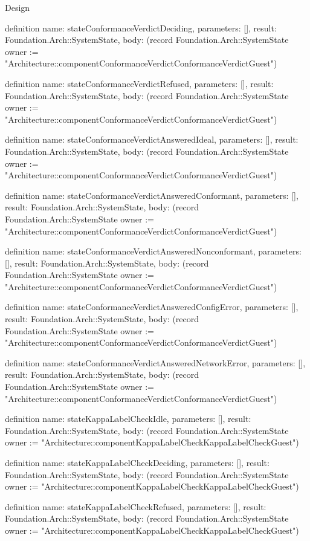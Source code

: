 \begin{lexlean}{Design}
\begin{semanticmodule}
definition{
  name: stateConformanceVerdictDeciding,
  parameters: [],
  result: Foundation.Arch::SystemState,
  body: (record Foundation.Arch::SystemState {owner := "Architecture::componentConformanceVerdictConformanceVerdictGuest"})
}

definition{
  name: stateConformanceVerdictRefused,
  parameters: [],
  result: Foundation.Arch::SystemState,
  body: (record Foundation.Arch::SystemState {owner := "Architecture::componentConformanceVerdictConformanceVerdictGuest"})
}

definition{
  name: stateConformanceVerdictAnsweredIdeal,
  parameters: [],
  result: Foundation.Arch::SystemState,
  body: (record Foundation.Arch::SystemState {owner := "Architecture::componentConformanceVerdictConformanceVerdictGuest"})
}

definition{
  name: stateConformanceVerdictAnsweredConformant,
  parameters: [],
  result: Foundation.Arch::SystemState,
  body: (record Foundation.Arch::SystemState {owner := "Architecture::componentConformanceVerdictConformanceVerdictGuest"})
}

definition{
  name: stateConformanceVerdictAnsweredNonconformant,
  parameters: [],
  result: Foundation.Arch::SystemState,
  body: (record Foundation.Arch::SystemState {owner := "Architecture::componentConformanceVerdictConformanceVerdictGuest"})
}

definition{
  name: stateConformanceVerdictAnsweredConfigError,
  parameters: [],
  result: Foundation.Arch::SystemState,
  body: (record Foundation.Arch::SystemState {owner := "Architecture::componentConformanceVerdictConformanceVerdictGuest"})
}

definition{
  name: stateConformanceVerdictAnsweredNetworkError,
  parameters: [],
  result: Foundation.Arch::SystemState,
  body: (record Foundation.Arch::SystemState {owner := "Architecture::componentConformanceVerdictConformanceVerdictGuest"})
}

definition{
  name: stateKappaLabelCheckIdle,
  parameters: [],
  result: Foundation.Arch::SystemState,
  body: (record Foundation.Arch::SystemState {owner := "Architecture::componentKappaLabelCheckKappaLabelCheckGuest"})
}

definition{
  name: stateKappaLabelCheckDeciding,
  parameters: [],
  result: Foundation.Arch::SystemState,
  body: (record Foundation.Arch::SystemState {owner := "Architecture::componentKappaLabelCheckKappaLabelCheckGuest"})
}

definition{
  name: stateKappaLabelCheckRefused,
  parameters: [],
  result: Foundation.Arch::SystemState,
  body: (record Foundation.Arch::SystemState {owner := "Architecture::componentKappaLabelCheckKappaLabelCheckGuest"})
}


\end{semanticmodule}
\end{lexlean}
